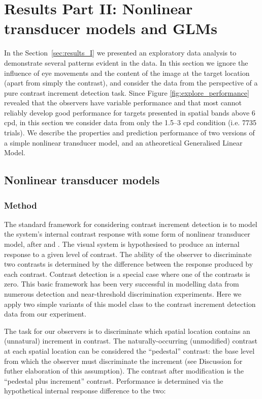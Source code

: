 \documentclass[11pt,a4paper]{article}
\begin{document}
\section{Results Part II: Nonlinear transducer models and GLMs}
\label{sec:results_II}

In the Section~\ref{sec:results_I} we presented an exploratory data analysis to demonstrate several patterns evident in the data.
In this section we ignore the influence of eye movements and the content of the image at the target location (apart from simply the contrast), and consider the data from the perspective of a pure contrast increment detection task.
Since Figure \ref{fig:explore_performance} revealed that the observers have variable performance and that most cannot reliably develop good performance for targets presented in spatial bands above 6 cpd, in this section we consider data from only the 1.5--3 cpd condition (i.e. 7735 trials).
We describe the properties and prediction performance of two versions of a simple nonlinear transducer model, and an atheoretical Generalised Linear Model.

\subsection{Nonlinear transducer models}

\subsubsection{Method}

The standard framework for considering contrast increment detection is to model the system's internal contrast response with some form of nonlinear transducer model, after \citet{Stromeyer1974} and \citet{Legge1980}.
The visual system is hypothesised to produce an internal response to a given level of contrast.
The ability of the observer to discriminate two contrasts is determined by the difference between the response produced by each contrast.
Contrast detection is a special case where one of the contrasts is zero.
This basic framework has been very successful in modelling data from numerous detection and near-threshold discrimination experiments. %
Here we apply two simple variants of this model class to the contrast increment detection data from our experiment.

The task for our observers is to discriminate which spatial location contains an (unnatural) increment in contrast.
The naturally-occurring (unmodified) contrast at each spatial location can be considered the ``pedestal'' contrast: the base level from which the observer must discriminate the increment (see Discussion for futher elaboration of this assumption).
The contrast after modification is the ``pedestal plus increment'' contrast.
Performance is determined via the hypothetical internal response difference to the two:
\end{document}

